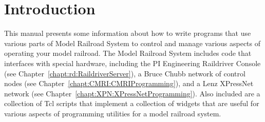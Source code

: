 
\chapter{Introduction}
\label{chapt:Introduction}

This manual presents some information about how to write programs that
use various parts of Model Railroad System to control and manage
various aspects of operating your model railroad.  The Model Railroad
System includes code that interfaces with special hardware, including
the PI Engineering Raildriver Console (see
Chapter~\ref{chapt:rd:RaildriverServer}), a Bruce Chubb network of
control nodes (see  Chapter~\ref{chapt:CMRI:CMRIProgramming}), and a
Lenz XPressNet network (see
Chapter~\ref{chapt:XPN:XPressNetProgramming}).  Also included are a
collection of Tcl scripts that implement a collection of widgets that
are useful for various aspects of programming utilities for a model
railroad system.

